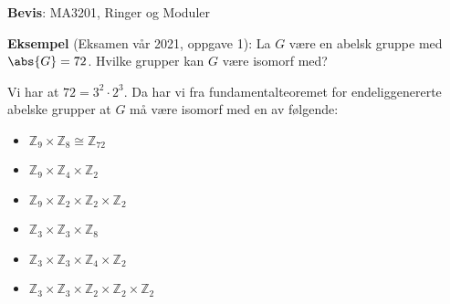 \textbf{Bevis}: MA3201, Ringer og Moduler 

\textbf{Eksempel} (Eksamen vår 2021, oppgave 1):
La $G$ være en abelsk gruppe med $\abs{G}=72$. Hvilke grupper kan $G$ være isomorf med?

Vi har at $72=3^2 \cdot 2^3$. Da har vi fra fundamentalteoremet for endeliggenererte abelske
grupper at $G$ må være isomorf med en av følgende:
\begin{itemize}
  \item $\mathbb{Z}_{9}\times \mathbb{Z}_8\cong \mathbb{Z}_{72}$
  \item $\mathbb{Z}_{9}\times \mathbb{Z}_4\times \mathbb{Z}_2$
  \item $\mathbb{Z}_{9}\times \mathbb{Z}_2\times \mathbb{Z}_2\times \mathbb{Z}_2$
  \item $\mathbb{Z}_3\times \mathbb{Z}_3\times \mathbb{Z}_8$
  \item $\mathbb{Z}_3\times \mathbb{Z}_3\times \mathbb{Z}_4\times \mathbb{Z}_2$
  \item $\mathbb{Z}_3\times \mathbb{Z}_3\times \mathbb{Z}_2\times \mathbb{Z}_2\times \mathbb{Z}_2$
\end{itemize}
